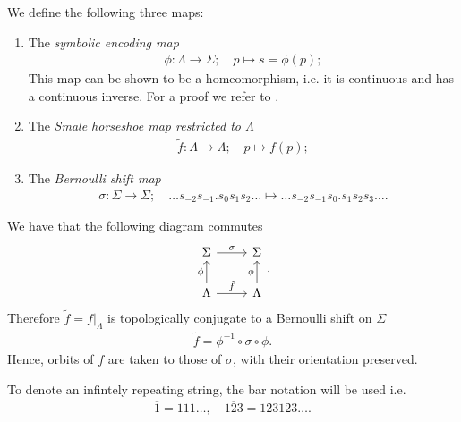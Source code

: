 \begin{definition}
	We define the following three maps:
	\begin{enumerate}
		
\item The \emph{symbolic encoding map}
	\begin{align}
		\boxed{
			\phi:\Lambda \to \Sigma;\quad p \mapsto s= \phi(p);
		}
	\end{align}
This map can be shown to be a homeomorphism, i.e. it is continuous and has a continuous inverse. For a proof we refer to \cite{GuckenheimerHolmes}.

\item The \emph{Smale horseshoe map restricted to $\Lambda$}
	\begin{align}
		\boxed{
			\tilde{f}:\Lambda \to \Lambda;\quad p \mapsto f(p);
		}
	\end{align}
\item The \emph{Bernoulli shift map}
	\begin{align}
		\boxed{
			\sigma:\Sigma \to \Sigma;\quad
			\ldots s_{-2} s_{-1} \bm{.} s_0 s_1 s_2 \ldots 
			\mapsto
			\ldots s_{-2}s_{-1}s_{0}\bm{.} s_1 s_2 s_3 \ldots.
		}
	\end{align}
	
	\end{enumerate}
\end{definition}
We have that the following diagram commutes
\begin{equation}
\begin{tikzcd}
	\Sigma \arrow[r, "\sigma"] 
& \Sigma \\
\Lambda \arrow[u,"\phi"] \arrow[r, "\tilde{f}"]
& \Lambda \arrow[u, "\phi"] 
\end{tikzcd}.
\end{equation}
Therefore $\tilde{f} = \left. f\right|_{\Lambda}$ is topologically conjugate to a Bernoulli shift on $\Sigma$ 
	\begin{align}
		\tilde{f} = \phi^{-1} \circ \sigma \circ \phi.
	\end{align}
Hence, orbits of $f$ are taken to those of $\sigma$, with their orientation preserved.	

\begin{remark}[]
	To denote an infintely repeating string, the bar notation will be used i.e.
	\begin{align}
		\overline{1} = 111\ldots,\quad \overline{123}=123123\ldots.
	\end{align}
\end{remark}


